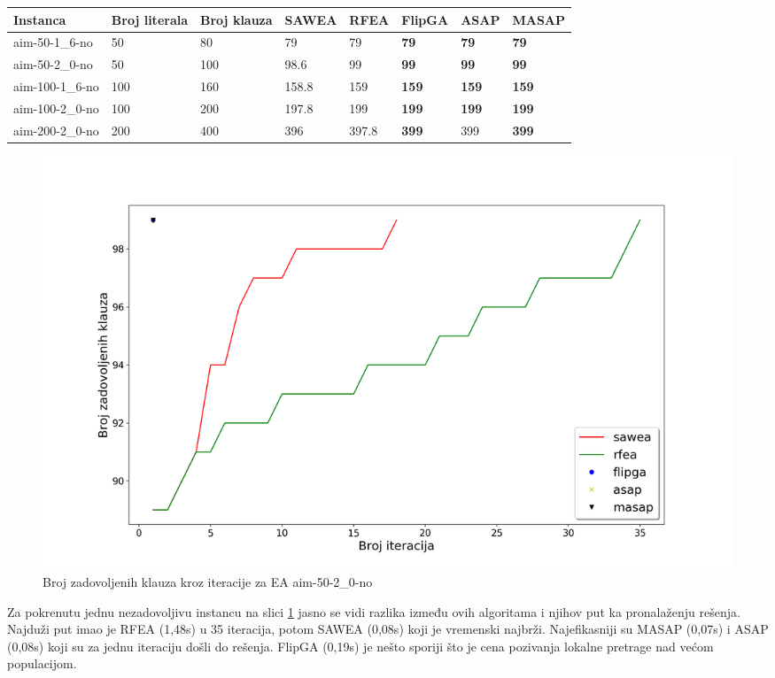 \documentclass[a4paper]{article}
\begin{document}
\begin{table}[h!]
\centering
{}\label{tab:ea_UNSAT}
\begin{tabular}{ |p{2.4cm}|p{1cm}|p{1cm}||p{1.2cm}|p{1.2cm}|p{1.2cm}|p{1.2cm}|p{1.2cm}|}
 \hline
Instanca & Broj \break literala & Broj \break klauza & SAWEA & RFEA & FlipGA & ASAP & MASAP \\ 
 \hline
 aim-50-1\_6-no & 50 & 80 & 79 & 79 & \textbf{79} & \textbf{79} & \textbf{79} \\
 aim-50-2\_0-no & 50 & 100 & 98.6 &  99 & \textbf{99} & \textbf{99} & \textbf{99}\\
 aim-100-1\_6-no & 100 & 160 & 158.8 & 159 & \textbf{159} & \textbf{159} & \textbf{159} \\
 aim-100-2\_0-no & 100 & 200 & 197.8 & 199 & \textbf{199} & \textbf{199} & \textbf{199} \\
 aim-200-2\_0-no & 200 & 400 & 396 & 397.8 & \textbf{399} & 399 & \textbf{399} \\ 
 \hline
\end{tabular}
\end{table}

\begin{figure}[h!]
\centering
\includegraphics[width=\textwidth]{ea-aim-50-2_0-no}
\caption{Broj zadovoljenih klauza kroz iteracije za EA aim-50-2\_0-no}\label{img:ea_no1}
\end{figure}

Za pokrenutu jednu nezadovoljivu instancu na slici \ref{img:ea_no1} 
jasno se vidi razlika između ovih algoritama i njihov put ka pronalaženju rešenja.
Najduži put imao je RFEA (1,48s) u 35 iteracija, potom SAWEA (0,08s) koji je vremenski 
najbrži. Najefikasniji su MASAP (0,07s) i ASAP (0,08s) koji su za jednu iteraciju 
došli do rešenja. FlipGA (0,19s) je nešto sporiji što je cena pozivanja lokalne pretrage 
nad većom populacijom.\\
\end{document}
